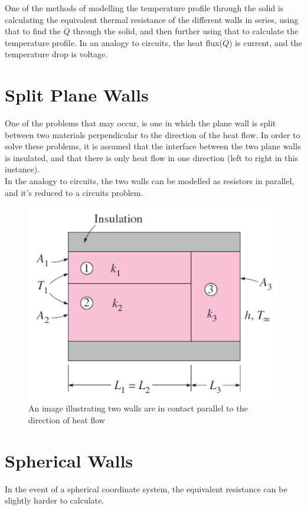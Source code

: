 \documentclass[•]{article}
\begin{document}
One of the methods of modelling the temperature profile through the solid is calculating the equivalent thermal resistance of the different walls in series, using that to find the $\dot{Q}$ through the solid, and then further using that to calculate the temperature profile. In an analogy to circuits, the heat flux($\dot{Q}$) is current, and the temperature drop is voltage. 

\section*{Split Plane Walls}
One of the problems that may occur, is one in which the plane wall is split between two materials perpendicular to the direction of the heat flow. In order to solve these problems, it is assumed that the interface between the two plane walls is insulated, and that there is only heat flow in one direction (left to right in this instance).\\

In the analogy to circuits, the two walls can be modelled as resistors in parallel, and it's reduced to a circuits problem.
\begin{figure}[H]
\begin{center}
\includegraphics[scale=0.4]{SplitWall.png}
\end{center}
\caption{An image illustrating two walls are in contact parallel to the direction of heat flow}
\end{figure}

\section*{Spherical Walls}
In the event of a spherical coordinate system, the equivalent resistance can be slightly harder to calculate.
\end{document}
